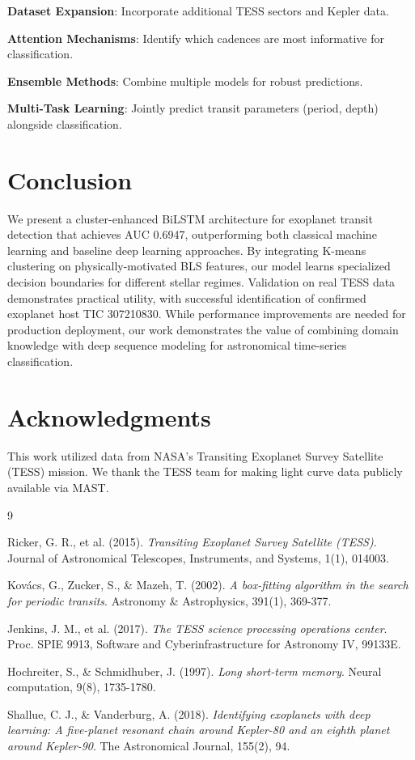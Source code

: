 \documentclass[twocolumn]{article}
\begin{document}
\textbf{Dataset Expansion}: Incorporate additional TESS sectors and Kepler data.

\textbf{Attention Mechanisms}: Identify which cadences are most informative for classification.

\textbf{Ensemble Methods}: Combine multiple models for robust predictions.

\textbf{Multi-Task Learning}: Jointly predict transit parameters (period, depth) alongside classification.

\section{Conclusion}

We present a cluster-enhanced BiLSTM architecture for exoplanet transit detection that achieves AUC 0.6947, outperforming both classical machine learning and baseline deep learning approaches. By integrating K-means clustering on physically-motivated BLS features, our model learns specialized decision boundaries for different stellar regimes. Validation on real TESS data demonstrates practical utility, with successful identification of confirmed exoplanet host TIC 307210830. While performance improvements are needed for production deployment, our work demonstrates the value of combining domain knowledge with deep sequence modeling for astronomical time-series classification.

\section{Acknowledgments}

This work utilized data from NASA's Transiting Exoplanet Survey Satellite (TESS) mission. We thank the TESS team for making light curve data publicly available via MAST.


\begin{thebibliography}{9}

Ricker, G. R., et al. (2015).
\textit{Transiting Exoplanet Survey Satellite (TESS)}.
Journal of Astronomical Telescopes, Instruments, and Systems, 1(1), 014003.

Kovács, G., Zucker, S., \& Mazeh, T. (2002).
\textit{A box-fitting algorithm in the search for periodic transits}.
Astronomy \& Astrophysics, 391(1), 369-377.

Jenkins, J. M., et al. (2017).
\textit{The TESS science processing operations center}.
Proc. SPIE 9913, Software and Cyberinfrastructure for Astronomy IV, 99133E.

Hochreiter, S., \& Schmidhuber, J. (1997).
\textit{Long short-term memory}.
Neural computation, 9(8), 1735-1780.

Shallue, C. J., \& Vanderburg, A. (2018).
\textit{Identifying exoplanets with deep learning: A five-planet resonant chain around Kepler-80 and an eighth planet around Kepler-90}.
The Astronomical Journal, 155(2), 94.

\end{thebibliography}
\end{document}

